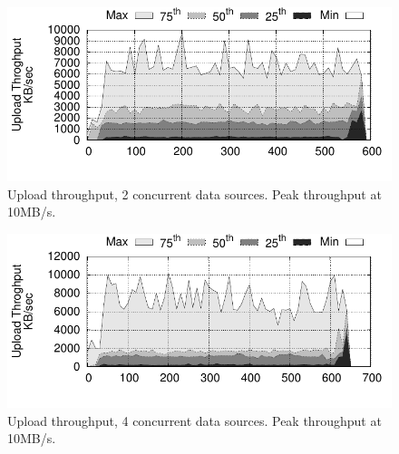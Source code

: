 \begin{figure}[t!]
  \centering
  \includegraphics[scale=0.7]{../../experiment/results/throughput/outputs/tput_upload_4-datas-2-workers.pdf}
  \caption{Upload throughput, 2 concurrent data sources. Peak throughput at 10MB/s.}
  \label{fig:throughput2}
\end{figure}
\begin{figure}[t!]
  \centering
  \includegraphics[scale=0.7]{../../experiment/results/throughput/outputs/tput_upload_4-datas-4-workers.pdf}
  \caption{Upload throughput, 4 concurrent data sources. Peak throughput at 10MB/s.}
  \label{fig:throughput4}
\end{figure}


